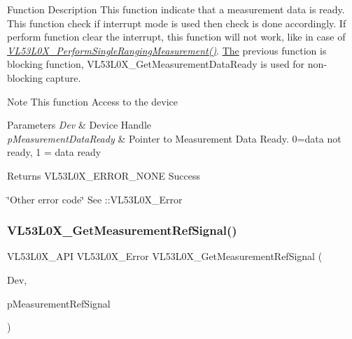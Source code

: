 \begin{DoxyParagraph}{Function Description}
This function indicate that a measurement data is ready. This function check if interrupt mode is used then check is done accordingly. If perform function clear the interrupt, this function will not work, like in case of {\itshape \hyperlink{group__VL53L0X__measurement__group_gae81888494fb896a4a8922f16832291c1}{V\+L53\+L0\+X\+\_\+\+Perform\+Single\+Ranging\+Measurement()}}. \hyperlink{structThe}{The} previous function is blocking function, V\+L53\+L0\+X\+\_\+\+Get\+Measurement\+Data\+Ready is used for non-\/blocking capture.
\end{DoxyParagraph}
\begin{DoxyNote}{Note}
This function Access to the device
\end{DoxyNote}

\begin{DoxyParams}{Parameters}
{\em Dev} & Device Handle \\
\hline
{\em p\+Measurement\+Data\+Ready} & Pointer to Measurement Data Ready. 0=data not ready, 1 = data ready \\
\hline
\end{DoxyParams}
\begin{DoxyReturn}{Returns}
V\+L53\+L0\+X\+\_\+\+E\+R\+R\+O\+R\+\_\+\+N\+O\+NE Success 

\char`\"{}\+Other error code\char`\"{} See \+::\+V\+L53\+L0\+X\+\_\+\+Error 
\end{DoxyReturn}
\mbox{\label{group__VL53L0X__measurement__group_ga744e1c15a276c1ecc68e308ac66ea414}} 
\subsubsection{\texorpdfstring{V\+L53\+L0\+X\+\_\+\+Get\+Measurement\+Ref\+Signal()}{VL53L0X\_GetMeasurementRefSignal()}}
{\footnotesize\ttfamily V\+L53\+L0\+X\+\_\+\+A\+PI V\+L53\+L0\+X\+\_\+\+Error V\+L53\+L0\+X\+\_\+\+Get\+Measurement\+Ref\+Signal (\begin{DoxyParamCaption}\item[{\hyperlink{group__VL53L0X__platform__group_ga2d6405308b1dd524b462f1b8fb97d167}{V\+L53\+L0\+X\+\_\+\+D\+EV}}]{Dev,  }\item[{\hyperlink{vl53l0x__types_8h_afb910790161809fc76e1a274a6349384}{Fix\+Point1616\+\_\+t} $\ast$}]{p\+Measurement\+Ref\+Signal }\end{DoxyParamCaption})}



